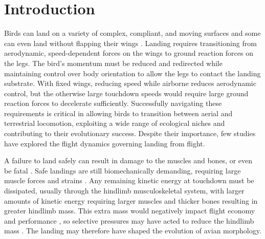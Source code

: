 \section{Introduction}\label{sec:introduction}

Birds can land on a variety of complex, compliant, and moving surfaces \cite{kovacLearningNatureHow2016,crandellCopingComplianceTakeoff2018,roderickBirdinspiredDynamicGrasping2021,whiteheadMallardLandingBehavior2023,bhagavatulaLandingSwingingPerch2025} and some can even land without flapping their wings \cite{carruthersAutomaticAeroelasticDevices2007,kleinheerenbrinkOptimizationAvianPerching2022}. Landing requires transitioning from aerodynamic, speed-dependent forces on the wings to ground reaction forces on the legs. The bird's momentum must be reduced and redirected while maintaining control over body orientation to allow the legs to contact the landing substrate. With fixed wings, reducing speed while airborne reduces aerodynamic control, but the otherwise large touchdown speeds would require large ground reaction forces to decelerate sufficiently. Successfully navigating these requirements is critical in allowing birds to transition between aerial and terrestrial locomotion, exploiting a wide range of ecological niches and contributing to their evolutionary success. Despite their importance, few studies have explored the flight dynamics governing landing from flight.

A failure to land safely can result in damage to the muscles and bones, or even be fatal \cite{klemBirdInjuriesCause1990,byrnesEcologicalBiomechanicalInsights2011}. Safe landings are still biomechanically demanding, requiring large muscle forces and strains \cite{proviniTransitionWingLeg2014,konowSeriesElasticShock2015}. Any remaining kinetic energy at touchdown must be dissipated, usually through the hindlimb musculoskeletal system, with larger amounts of kinetic energy requiring larger muscles and thicker bones resulting in greater hindlimb mass. This extra mass would negatively impact flight economy and performance \cite{kullbergImpairedPredatorEvasion1997,mardenMaximumLiftProduction1987}, so selective pressures may have acted to reduce the hindlimb mass \cite{heersWingsLegsAvian2015,shinFastGroundtoairTransition2024}. The landing may therefore have shaped the evolution of avian morphology.

